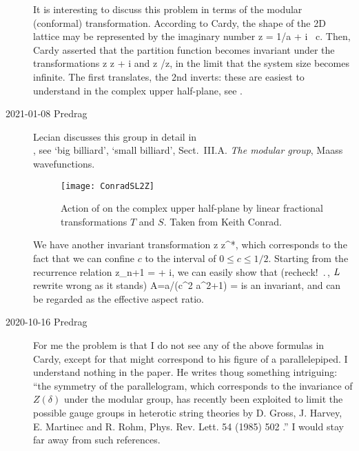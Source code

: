 \begin{description}
It is interesting to discuss this problem in terms of the
modular (conformal) transformation.  According to Cardy,
the shape of the 2D lattice may be represented by the imaginary number
\beq
  z = 1/a + i \ c.
Then, Cardy asserted that the partition function becomes invariant
under the transformations
\beq
  z \rightarrow z + i
and
\beq
  z /z,
in the limit that the system size becomes infinite.
The first translates, the 2nd inverts: these are easiest to understand in
the complex upper half-plane, see .

\item[2021-01-08 Predrag]
Lecian discusses this group in detail in\\
, see
`big billiard', `small billiard',
Sect.~III.A.  {\em The modular group},
Maass wavefunctions.

\begin{figure}
  \centering
  \texttt{[image: ConradSL2Z]}
  \caption{\label{ConradSL2Z}
Action of  on the complex upper half-plane by linear
fractional transformations $T$ and $S$.
Taken from Keith Conrad.
  }
\end{figure}

We have another invariant transformation
\beq
  z \rightarrow z^*,
which corresponds to the fact that we can confine $c$ to the interval
of $0 \le c \le 1/2$.
Starting from the recurrence relation
\beq
  z_{n+1} =  + i,
we can easily show that (recheck! $\period{}$, ${L_{}}$ rewrite wrong
as it stands)
\beq
A=a/(c^2 a^2+1)
 =\frac{\period{}}{\speriod{}}
is an invariant, and can be regarded as the effective aspect ratio.

\item[2020-10-16 Predrag]
For me the problem is that
I do not see any of the above formulas in Cardy,
except for  that might correspond to his
figure of a parallelepiped.
I understand nothing in the paper. He writes thoug
something intriguing:
``the symmetry of the parallelogram, which corresponds to the invariance
of $Z(\delta)$ under the modular group, has recently been exploited to
limit the possible gauge groups in heterotic string theories by
D. Gross, J. Harvey, E. Martinec and R. Rohm, Phys. Rev. Lett. 54 (1985) 502%
.'' I would stay far away from such references.



\end{description}
